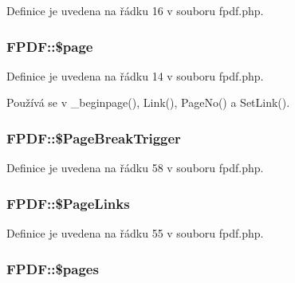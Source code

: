 Definice je uvedena na řádku 16 v souboru fpdf.\-php.

\hypertarget{class_f_p_d_f_ab36ea1d04d26856c68ed3021b56eec5b}{
\subsubsection[{\$page}]{\setlength{\rightskip}{0pt plus 5cm}F\-P\-D\-F\-::\$page}}\label{class_f_p_d_f_ab36ea1d04d26856c68ed3021b56eec5b}


Definice je uvedena na řádku 14 v souboru fpdf.\-php.



Používá se v \-\_\-beginpage(), Link(), Page\-No() a Set\-Link().

\hypertarget{class_f_p_d_f_a1a0fd03d8f95b0119fed813fe5c980a8}{
\subsubsection[{\$\-Page\-Break\-Trigger}]{\setlength{\rightskip}{0pt plus 5cm}F\-P\-D\-F\-::\$\-Page\-Break\-Trigger}}\label{class_f_p_d_f_a1a0fd03d8f95b0119fed813fe5c980a8}


Definice je uvedena na řádku 58 v souboru fpdf.\-php.

\hypertarget{class_f_p_d_f_a3e93616a74e983712775cb72a00fed38}{
\subsubsection[{\$\-Page\-Links}]{\setlength{\rightskip}{0pt plus 5cm}F\-P\-D\-F\-::\$\-Page\-Links}}\label{class_f_p_d_f_a3e93616a74e983712775cb72a00fed38}


Definice je uvedena na řádku 55 v souboru fpdf.\-php.

\hypertarget{class_f_p_d_f_a43708e8b1a7d9c88f08982c4473d7767}{
\subsubsection[{\$pages}]{\setlength{\rightskip}{0pt plus 5cm}F\-P\-D\-F\-::\$pages}}\label{class_f_p_d_f_a43708e8b1a7d9c88f08982c4473d7767}



